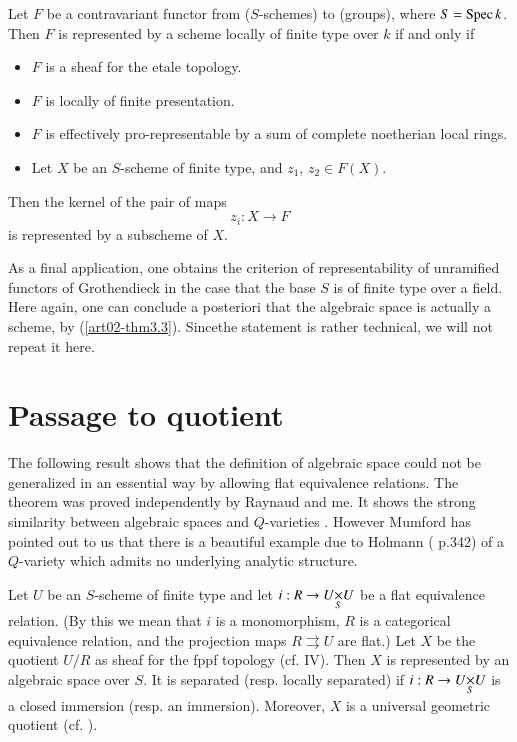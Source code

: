 \begin{theorem}\label{art02-thm6.4}
Let $F$ be a contravariant functor from ($S$-schemes) to (groups), where $S=\operatorname{\mathrm{Spec}} k$. Then $F$ is represented by a scheme locally of finite type over $k$ if and only if
\begin{itemize}
\item[{\rm[0]}] $F$ is a sheaf for the etale topology.

\item[{\rm[1]}] $F$ is locally of finite presentation.

\item[{\rm[2]}] $F$ is effectively pro-representable by a sum of complete noetherian local rings.

\item[{\rm[3]}] Let $X$ be an $S$-scheme of finite type, and $z_{1}$, $z_{2}\in F(X)$.
\end{itemize}

Then the kernel of the pair of maps
$$
z_{i}:X\to F
$$
is represented by a subscheme of $X$.
\end{theorem}

\noindent
As a final application, one obtains the criterion of representability of unramified functors of Grothendieck \cite{art02-key28} in the case that the base $S$ is of finite type over a field. Here again, one can conclude a posteriori that the algebraic space is actually a scheme, by (\ref{art02-thm3.3}). Since\pageoriginale the statement \cite{art02-key28} is rather technical, we will not repeat it here.

\section{Passage to quotient}\label{art02-sec7}

The following result shows that the definition of algebraic space could not be generalized in an essential way by allowing flat equivalence relations. The theorem was proved independently by Raynaud \cite{art02-key30} and me. It shows the strong similarity between algebraic spaces and $Q$-varieties \cite{art02-key24}. However Mumford has pointed out to us that there is a beautiful example due to Holmann (\cite{art02-key19} p.342) of a $Q$-variety which admits no underlying analytic structure.

\begin{theorem}\label{art02-sec7.1}
Let $U$ be an $S$-scheme of finite type and let $i:R\to \fprod{U}{U}{S}$ be a flat equivalence relation. (By this we mean that $i$ is a monomorphism, $R$ is a categorical equivalence relation, and the projection maps $R\rightrightarrows U$ are flat.) Let $X$ be the quotient $U/R$ as sheaf for the fppf topology (cf. \cite{art02-key7} IV). Then $X$ is represented by an algebraic space over $S$. It is separated (resp. locally separated) if $i:R\to\fprod{U}{U}{S}$ is a closed immersion (resp. an immersion). Moreover, $X$ is a universal geometric quotient (cf. \cite{art02-key25}).
\end{theorem}


